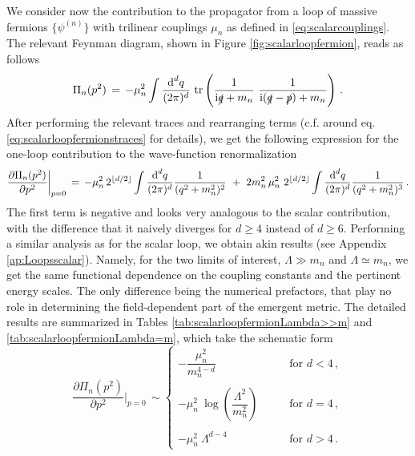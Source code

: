 We consider now the contribution to the propagator from a loop of massive fermions $\{\psi^{(n)}\}$ with trilinear couplings $\mu_n$ as defined in \eqref{eq:scalarcouplings}. The relevant Feynman diagram, shown in Figure \ref{fig:scalarloopfermion}, reads as follows
%
\begin{equation}
		\label{eq:selfenergyfermion}
		\Pi_n(p^2) \, = \, -\mu_n^2  \int \frac {\text{d}^dq}{(2\pi)^d}\ \text{tr} \left (\frac {1}{\i \slashed{q}+m_n}\ \frac {1}{\i (\slashed{q}-\slashed{p})+m_n} \right) \, .
\end{equation}
%
After performing the relevant traces and rearranging terms (c.f. around eq. \eqref{eq:scalarloopfermionstraces} for details), we get the following  expression for the one-loop contribution to the wave-function renormalization 
%
\begin{equation} \label{eq:wfrfermionloop}
		\frac{\partial \Pi_n(p^2)}{\partial p^2} \bigg\rvert_{p=0} \, = \,   -\mu_n^2\, 2^{\lfloor d/2 \rfloor}  \int \frac {\text{d}^dq}{(2\pi)^d} \frac{1}{(q^2+m_n^2)^2} \ + \ 2 m_n^2 \, \mu_n^2\ 2^{\lfloor d/2 \rfloor} \int \frac {\text{d}^dq}{(2\pi)^d} \frac{1}{(q^2+m_n^2)^3} \, .
\end{equation}
%
The first term is negative and looks very analogous to the scalar contribution, with the difference that it naively diverges for $d\geq 4$ instead of $d\geq 6$. Performing a similar analysis as for the scalar loop, we obtain akin results (see Appendix \ref{ap:Loopsscalar}). Namely, for the two limits of interest, $\Lambda \gg m_n$ and $\Lambda \simeq m_n$, we get the same functional dependence on the coupling constants and the pertinent energy scales. The only difference being the numerical prefactors, that play no role in determining the field-dependent part of the emergent metric. The detailed results are summarized in Tables \ref{tab:scalarloopfermionLambda>>m} and \ref{tab:scalarloopfermionLambda=m}, which take the schematic form
%
\begin{equation}\label{eq:scalarloopfermionssummary}
		\frac {\partial \Pi_n(p^2)}{\partial p^2} \bigg\rvert_{p=0}\,   \sim 
		\left\{\begin{array}{lr}
			-  \dfrac{\mu_n^2}{m_n^{4-d}} & \qquad\text{for } d< 4\, ,\\ \\ 
			-\mu_n^2\ \log \left( \dfrac{\Lambda^2}{m_n^2}\right) &\qquad \text{for } d= 4\, ,\\ \\ 
			-\mu_n^2\ \Lambda^{d-4}&\qquad \text{for } d>4\, .
		\end{array}\right.
\end{equation}
